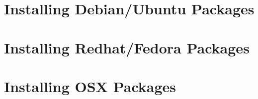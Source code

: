 \section{Installing Debian/Ubuntu Packages}
\label{s:installation:debian}

\section{Installing Redhat/Fedora Packages}
\label{s:installation:redhat}

\section{Installing OSX Packages}
\label{s:installation:osx}

